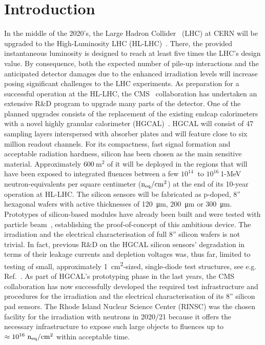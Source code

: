 \section{Introduction}
\label{sec:introduction}
In the middle of the 2020's, the Large Hadron Collider~\cite{evans:2008} (LHC) at CERN will be upgraded to the High-Luminosity LHC (HL-LHC)~\cite{hl-lhc-tdr:2017}.
There, the provided instantaneous luminosity is designed to reach at least five times the LHC's design value.
By consequence, both the expected number of pile-up interactions and the anticipated detector damages due to the enhanced irradiation levels will increase posing significant challenges to the LHC experiments.
As preparation for a successful operation at the HL-LHC, the CMS~\cite{cms:2008} collaboration has undertaken an extensive R$\&$D program to upgrade many parts of the detector.
One of the planned upgrades consists of the replacement of the existing endcap calorimeters with a novel highly granular calorimeter (HGCAL)~\cite{hgcal-tdr:2018}.
HGCAL will consist of 47 sampling layers interspersed with absorber plates and will feature close to six million readout channels.
For its compactness, fast signal formation and acceptable radiation hardness, silicon has been chosen as the main sensitive material.
Approximately $\SI{600}{\metre\squared}$ of it will be deployed in the regions that will have been exposed to integrated fluences between a few $10^{14}~$ to $10^{16}~$1-MeV neutron-equivalents per square centimeter ($\mathrm{n_{eq}}/\mathrm{cm}^{2}$) at the end of its 10-year operation at HL-LHC. 
The silicon sensors will be fabricated as p-doped, 8'' hexagonal wafers with active thicknesses of \SI{120}{\micro\metre}, \SI{200}{\micro\metre} or \SI{300}{\micro\metre}.
Prototypes of silicon-based modules have already been built and were tested with particle beam~\cite{cms_hgc-2016-beamtests,H1:2020,H2:2020}, establishing the proof-of-concept of this ambitious device.
The irradiation and the electrical characterisation of full 8'' silicon wafers is not trivial.
In fact, previous R$\&$D on the HGCAL silicon sensors' degradation in terms of their leakage currents and depletion voltages was, thus far, limited to testing of small, approximately \SI{1}{\centi\metre\squared}-sized, single-diode test structures, see e.g. Ref.~\cite{Curr_s_2017}.
As part of HGCAL's prototyping phase in the last years, the CMS collaboration has now successfully developed the required test infrastructure and procedures for the irradiation and the electrical characterisation of its 8'' silicon pad sensors.
The Rhode Island Nuclear Science Center (RINSC) was the chosen facility for the irradiation with neutrons in 2020/21 because it offers the necessary infrastructure to expose such large objects to fluences up to $\approx 10^{16}~\mathrm{n_{eq}}/\mathrm{cm}^{2}$ within acceptable time.
